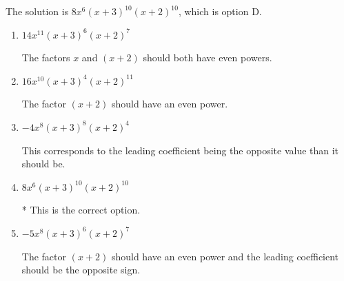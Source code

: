 \documentclass{extbook}[14pt]
\begin{document}
\begin{enumerate}
{The solution is \( 8x^{6} (x + 3)^{10} (x + 2)^{10} \), which is option D.\begin{enumerate}[label=\Alph*.]
\item \( 14x^{11} (x + 3)^{6} (x + 2)^{7} \)

The factors $x$ and $(x + 2)$ should both have even powers.
\item \( 16x^{10} (x + 3)^{4} (x + 2)^{11} \)

The factor $(x + 2)$ should have an even power.
\item \( -4x^{8} (x + 3)^{8} (x + 2)^{4} \)

This corresponds to the leading coefficient being the opposite value than it should be.
\item \( 8x^{6} (x + 3)^{10} (x + 2)^{10} \)

* This is the correct option.
\item \( -5x^{8} (x + 3)^{6} (x + 2)^{7} \)

The factor $(x + 2)$ should have an even power and the leading coefficient should be the opposite sign.
\end{enumerate}

}
\end{enumerate}
\end{document}
